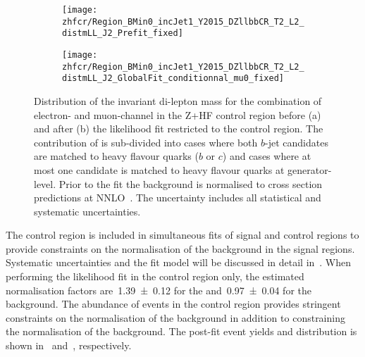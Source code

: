 \begin{figure}[htbp]
  \centering


  \begin{subfigure}{.485\textwidth}
    \texttt{[image: zhfcr/Region\_BMin0\_incJet1\_Y2015\_DZllbbCR\_T2\_L2\_distmLL\_J2\_Prefit\_fixed]}
    \label{fig:zcr_mll_prefit}
  \end{subfigure}\hfill%
  \begin{subfigure}{.485\textwidth}
    \texttt{[image: zhfcr/Region\_BMin0\_incJet1\_Y2015\_DZllbbCR\_T2\_L2\_distmLL\_J2\_GlobalFit\_conditionnal\_mu0\_fixed]}
    \label{fig:zcr_mll_postfit}
  \end{subfigure}

  \caption{Distribution of the invariant di-lepton mass for the
    combination of electron- and muon-channel in the Z+HF control
    region before (a) and after (b) the likelihood fit restricted to
    the control region. The contribution of \Zjets is sub-divided into
    cases where both $b$-jet candidates are matched to heavy flavour
    quarks ($b$ or $c$) and cases where at most one candidate is
    matched to heavy flavour quarks at generator-level. Prior to the
    fit the \Zjets background is normalised to cross section
    predictions at NNLO~\cite{Anastasiou:2003ds}. The uncertainty
    includes all statistical and systematic uncertainties.}
\end{figure}

The \ZHF control region is included in simultaneous fits of signal and
control regions to provide constraints on the normalisation of the
\ZHF background in the signal regions. Systematic uncertainties and
the fit model will be discussed in detail
in~. When performing
the likelihood fit in the control region only, the estimated
normalisation factors are~\num{1.39 \pm 0.12} for the \ZHF
and~\num{0.97 \pm 0.04} for the \ttbar background. The abundance of
\ttbar events in the control region provides stringent constraints on
the normalisation of the \ttbar background in addition to constraining
the normalisation of the \ZHF background. The post-fit event yields
and \mll distribution is shown in~
and~, respectively.

